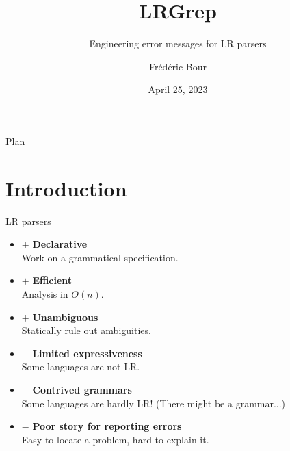 \documentclass[aspectratio=169]{beamer}          %
\title{LRGrep}  %
\subtitle{Engineering error messages for LR parsers}
\author{Frédéric Bour}                %
\institute{Tarides, Inria}          %
\date{April 25, 2023}                  %
\begin{document}
\begin{frame}
  \titlepage
\end{frame}

\begin{frame}{Plan}
  \tableofcontents
\end{frame}


\section{Introduction}

\newcommand\pro{\item[$+$]}
\newcommand\con{\item[$-$]}

\begin{frame}{LR parsers}

  \begin{itemize}
    \pro \textbf{Declarative} \\
         {\small Work on a grammatical specification.}
    \pro \textbf{Efficient} \\
         {\small Analysis in $O(n)$.}
    \pro \textbf{Unambiguous} \\
         {\small Statically rule out ambiguities.}
    \pause
    \con \textbf{Limited expressiveness} \\
         {\small Some languages are not LR.}
    \con \textbf{Contrived grammars} \\
         {\small Some languages are hardly LR! (There might be a grammar...)}
    \con \textbf{Poor story for reporting errors} \\
         {\small Easy to locate a problem, hard to explain it.}
  \end{itemize}

\end{frame}
\end{document}
